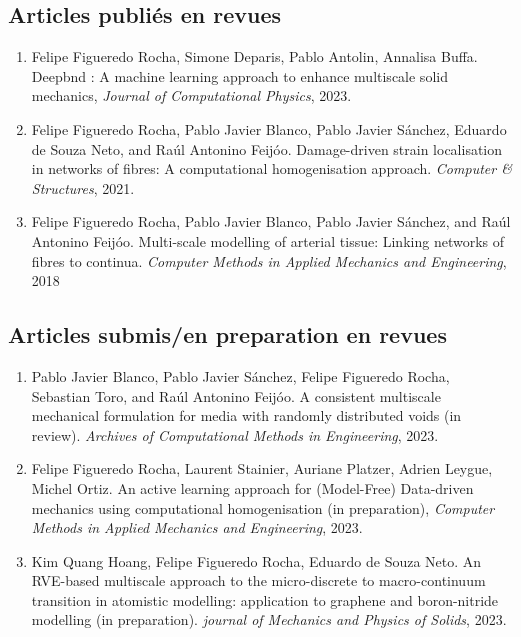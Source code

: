 \documentclass[french]{article}
\begin{document}
\subsection*{Articles publiés en revues}
\begin{enumerate}
	\item Felipe Figueredo Rocha, Simone Deparis, Pablo Antolin, Annalisa Buffa.  Deepbnd : A machine learning approach to enhance multiscale solid mechanics, \textit{Journal of Computational Physics}, 2023.
	\item Felipe Figueredo Rocha, Pablo Javier Blanco, Pablo Javier Sánchez, Eduardo de Souza Neto, and Raúl Antonino Feijóo. Damage-driven strain localisation in networks of fibres: A computational homogenisation approach. \textit{Computer \& Structures}, 2021.
	\item Felipe Figueredo Rocha, Pablo Javier Blanco, Pablo Javier Sánchez, and Raúl Antonino Feijóo. Multi-scale modelling of arterial tissue: Linking networks of fibres to continua. \textit{Computer Methods in Applied Mechanics and Engineering}, 2018
\end{enumerate}	
\subsection*{Articles submis/en preparation en revues}
\begin{enumerate}
\item Pablo Javier Blanco, Pablo Javier Sánchez, Felipe Figueredo Rocha, Sebastian Toro, and Raúl Antonino Feijóo. A consistent multiscale mechanical formulation for media with randomly distributed voids (in review). \textit{Archives of Computational Methods in Engineering}, 2023.
\item Felipe Figueredo Rocha, Laurent Stainier, Auriane Platzer, Adrien Leygue, Michel Ortiz. An active learning approach for (Model-Free) Data-driven
mechanics using computational homogenisation (in preparation), \textit{Computer Methods in Applied Mechanics and Engineering}, 2023.
\item Kim Quang Hoang, Felipe Figueredo Rocha, Eduardo de Souza Neto. An
RVE-based multiscale approach to the micro-discrete to
macro-continuum transition in atomistic modelling:
application to graphene and boron-nitride modelling (in preparation). \textit{journal of Mechanics and Physics of Solids}, 2023.
\end{enumerate}
\end{document}
